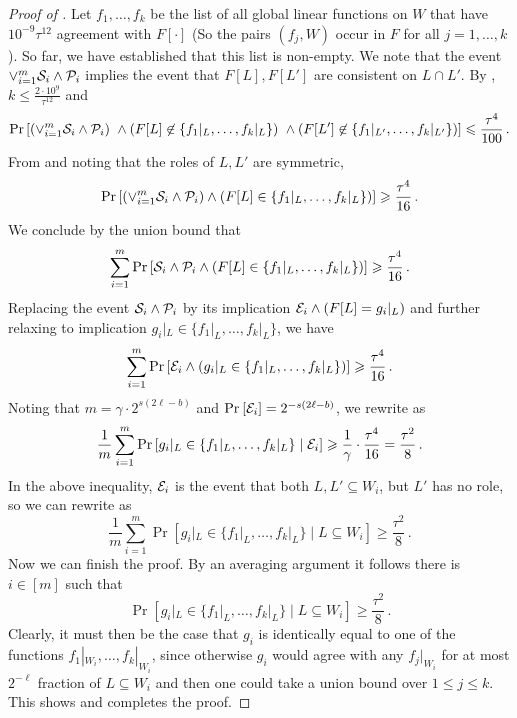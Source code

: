 \documentclass{toc}
\newcommand\Prob[2]{{\Pr_{#1}\left[ {#2} \right]}}
\renewcommand\geq{\geqslant}
\renewcommand\leq{\leqslant}
\begin{document}
\begin{proof}[Proof of ]
\smallskip  Let $f_1, \ldots, f_k$ be the list of all global linear functions on $W$ that have $10^{-9}\tau^{12}$ agreement with
 $F[\cdot]$ (So the pairs $(f_j,W)$ occur in $F$ for all $j=1,\ldots,k$). So far, we have established that this list is non-empty. We note that the event $\vee_{i=1}^m {\cal S}_i \wedge {\cal P}_i$ implies the event that $F[L], F[L']$ are consistent on $L \cap L'$.
 By , $k \leq \frac{2 \cdot 10^9}{ \tau^{12}}$ and
 \begin{equation} \label{eqn:key-2}
  \Prob{}{\left(\vee_{i=1}^m {\cal S}_i \wedge {\cal P}_i\right) \ \wedge  (F[L] \not\in \{ f_1|_L, \ldots, f_k|_L\}) \ \wedge (F[L'] \not\in \{ f_1|_{L'}, \ldots, f_k|_{L'} \})}  \leq  \frac{\tau^4}{100}\,.
  \end{equation}
From   and noting that the roles of $L, L'$ are symmetric,
  $$ \Prob{}{  \left(\vee_{i=1}^m {\cal S}_i \wedge {\cal P}_i\right) \wedge (F[L] \in   \{ f_1|_L, \ldots, f_k|_L\} )}  \geq  \frac{\tau^4}{16}\,. $$
%
We conclude %
by  %
the union bound that
 $$ \sum_{i=1}^m  \Prob{}{   {\cal S}_i \wedge {\cal P}_i  \wedge ( F[L] \in   \{ f_1|_L, \ldots, f_k|_L\}) }  \geq  \frac{\tau^4}{16}\,.$$
Replacing the event ${\cal S}_i \wedge {\cal P}_i$ by its implication ${\cal E}_i \wedge (F[L] = g_i|_L)$ and further relaxing to implication
$g_i|_L \in \{f_1|_L, \ldots, f_k|_L\}$, we have
 $$ \sum_{i=1}^m  \Prob{}{   {\cal E}_i   \wedge (g_i|_L  \in   \{ f_1|_L, \ldots, f_k|_L\}) }  \geq  \frac{\tau^4}{16}\,.$$
Noting that $m = \gamma \cdot 2^{s (2\ell-b)}$ and $\Prob{}{{\cal E}_i} = 2^{-s (2\ell-b)}$, we rewrite as
 $$  \frac{1}{m} \sum_{i=1}^m \Prob{}{g_i|_L \in  \{ f_1|_L, \ldots, f_k|_L\}  \mid {\cal E}_i } \geq  \frac{1}{\gamma} \cdot \frac{\tau^4}{16} = \frac{\tau^2}{8}\,.$$
In the above inequality, ${\cal E}_i$ is the event that both $L, L' \subseteq W_i$, but $L'$ has no role, so we can rewrite as
   $$  \frac{1}{m} \sum_{i=1}^m \Prob{}{g_i|_L \in  \{ f_1|_L, \ldots, f_k|_L\}  \mid L \subseteq W_i } \geq  \frac{\tau^2}{8}\,.$$
Now we can finish the proof. By an averaging argument it follows there is $i\in [m]$ such that
%
$$ \Prob{}{g_i|_L \in  \{ f_1|_L, \ldots, f_k|_L\}  \mid L \subseteq W_i } \geq  \frac{\tau^2}8\,.$$
Clearly, it must then be the case that $g_i$ is identically equal to one of the functions $f_1|_{W_i}, \ldots, f_k|_{W_i}$, since otherwise
$g_i$ would agree with any $f_j|_{W_i}$ for at most $2^{-\ell}$ fraction of $L \subseteq W_i$ and then one could take a union bound over $1 \leq j \leq k$. This shows
 and completes the proof.
\end{proof}
\end{document}
